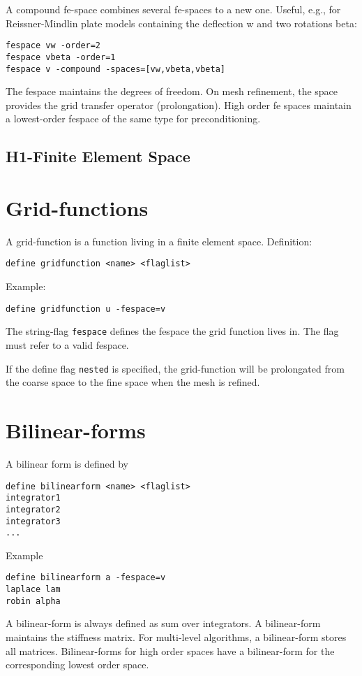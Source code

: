 \documentclass[12pt]{book}
\begin{document}
A compound fe-space combines several fe-spaces to a new one. Useful, e.g.,
for Reissner-Mindlin plate models containing the deflection w and
two rotations beta:
\begin{verbatim}
fespace vw -order=2
fespace vbeta -order=1
fespace v -compound -spaces=[vw,vbeta,vbeta]
\end{verbatim}


The fespace maintains the degrees of freedom. On mesh refinement, the space
provides the grid transfer operator (prolongation). High order fe spaces
maintain a lowest-order fespace of the same type for preconditioning.

\subsection{H1-Finite Element Space}

\section{Grid-functions}

A grid-function is a function living in a finite element space. Definition:
\begin{verbatim}
define gridfunction <name> <flaglist>
\end{verbatim}
Example:
\begin{verbatim}
define gridfunction u -fespace=v
\end{verbatim}

The string-flag {\tt fespace} defines the fespace the grid function lives in.
The flag must refer to a valid fespace. 

If the define flag {\tt nested} is specified, the grid-function will be 
prolongated from the coarse space to the fine space when the mesh is
refined.

\section{Bilinear-forms}

A bilinear form is defined by
\begin{verbatim}
define bilinearform <name> <flaglist>
integrator1
integrator2
integrator3
...
\end{verbatim}
Example
\begin{verbatim}
define bilinearform a -fespace=v
laplace lam
robin alpha
\end{verbatim}

A bilinear-form is always defined as sum over integrators. A bilinear-form 
maintains the stiffness matrix. For multi-level algorithms, a bilinear-form 
stores all matrices. Bilinear-forms for high order spaces have a bilinear-form
for the corresponding lowest order space.
\end{document}
